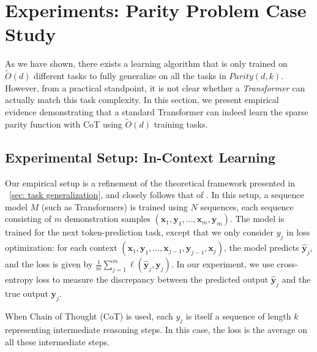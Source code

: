 \section{Experiments: Parity Problem Case Study}\label{sec: Experiments}





As we have shown, there exists a learning algorithm that is only trained on $\tilde O(d)$ different tasks to fully generalize on all the tasks in $Parity(d, k)$. However, from a practical standpoint, it is not clear whether a \textit{Transformer} can actually match this task complexity. In this section, we present empirical evidence demonstrating that a standard Transformer can indeed learn the sparse parity function with CoT using $\tilde{O}(d)$ training tasks.




\subsection{Experimental Setup: In-Context Learning }

Our empirical setup is a refinement of the theoretical framework presented in ~\cref{sec: task generalization}, and closely follows that of \citep{garg2022can, bhattamishra2024understanding}. In this setup, a
sequence model $M$ (such as Transformers) is trained using $N$ sequences, each sequence consisting of
$m$ demonstration samples $(\bm{x}_1, \bm{y}_1, \dots, \bm{x}_m, \bm{y}_m)$. The model is trained for the next token-prediction task,
except that we only consider $y_j$ in loss optimization: for each context $(\bm{x}_1, \bm{y}_1, \dots, \bm{x}_{j-1}, \bm{y}_{j-1}, \bm{x}_j)$, the model predicts $\hat{\bm{y}}_j$, and the loss is given by $\frac{1}{m} \sum_{j=1}^m \ell(\hat{\bm{y}}_j, \bm{y}_j)$. In our experiment, we use cross-entropy loss to measure the discrepancy between the predicted output $\hat{\bm{y}}_j$ and the true output $\bm{y}_j$.





When Chain of Thought (CoT) is used, each $y_j$ is itself a sequence of length $k$ representing intermediate reasoning steps. In this case, the loss is the average on all these intermediate steps. 

